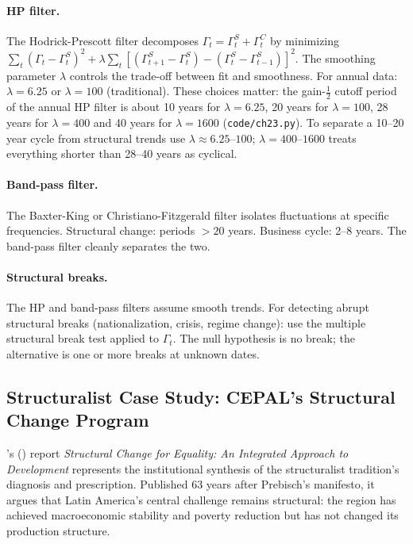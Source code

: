 \documentclass[../structural_economics_book.tex]{subfiles}
\begin{document}
\paragraph{HP filter.} The Hodrick-Prescott filter decomposes $\Gamma_t = \Gamma_t^S + \Gamma_t^C$ by minimizing $\sum_t (\Gamma_t - \Gamma_t^S)^2 + \lambda\sum_t [(\Gamma_{t+1}^S - \Gamma_t^S) - (\Gamma_t^S - \Gamma_{t-1}^S)]^2$. The smoothing parameter $\lambda$ controls the trade-off between fit and smoothness. For annual data: $\lambda = 6.25$ \citep{ravn2002adjusting} or $\lambda = 100$ (traditional). These choices matter: the gain-$\tfrac12$ cutoff period of the annual HP filter is about 10 years for $\lambda = 6.25$, 20 years for $\lambda = 100$, 28 years for $\lambda = 400$ and 40 years for $\lambda = 1600$ (\texttt{code/ch23.py}). To separate a 10--20 year cycle from structural trends use $\lambda \approx 6.25$--$100$; $\lambda = 400$--$1600$ treats everything shorter than 28--40 years as cyclical.

\paragraph{Band-pass filter.} The Baxter-King or Christiano-Fitzgerald filter isolates fluctuations at specific frequencies. Structural change: periods $> 20$ years. Business cycle: 2--8 years. The band-pass filter cleanly separates the two.

\paragraph{Structural breaks.} The HP and band-pass filters assume smooth trends. For detecting abrupt structural breaks (nationalization, crisis, regime change): use the \citet{bai1998estimating} multiple structural break test applied to $\Gamma_t$. The null hypothesis is no break; the alternative is one or more breaks at unknown dates.


\subsection*{Structuralist Case Study: CEPAL's Structural Change Program}

\citeauthor{cepal2012structural}'s (\citeyear{cepal2012structural}) report \textit{Structural Change for Equality: An Integrated Approach to Development} represents the institutional synthesis of the structuralist tradition's diagnosis and prescription. Published 63 years after Prebisch's \citeyear{prebisch1949desarrollo} manifesto, it argues that Latin America's central challenge remains structural: the region has achieved macroeconomic stability and poverty reduction but has not changed its production structure.
\end{document}
